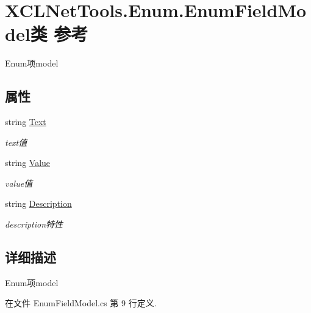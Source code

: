 \hypertarget{class_x_c_l_net_tools_1_1_enum_1_1_enum_field_model}{\section{X\-C\-L\-Net\-Tools.\-Enum.\-Enum\-Field\-Model类 参考}
\label{class_x_c_l_net_tools_1_1_enum_1_1_enum_field_model}
}


Enum项model  


\subsection*{属性}
\begin{DoxyCompactItemize}
\item 
string \hyperlink{class_x_c_l_net_tools_1_1_enum_1_1_enum_field_model_acbbc7df1972c0c70dfcf43413da878a8}{Text}
\begin{DoxyCompactList}\small\item\em text值 \end{DoxyCompactList}\item 
string \hyperlink{class_x_c_l_net_tools_1_1_enum_1_1_enum_field_model_a907462fed405f7065a6fc013cc919e29}{Value}
\begin{DoxyCompactList}\small\item\em value值 \end{DoxyCompactList}\item 
string \hyperlink{class_x_c_l_net_tools_1_1_enum_1_1_enum_field_model_a182875468bc25ee9c6adb98582e3683e}{Description}
\begin{DoxyCompactList}\small\item\em description特性 \end{DoxyCompactList}\end{DoxyCompactItemize}


\subsection{详细描述}
Enum项model 



在文件 Enum\-Field\-Model.\-cs 第 9 行定义.




